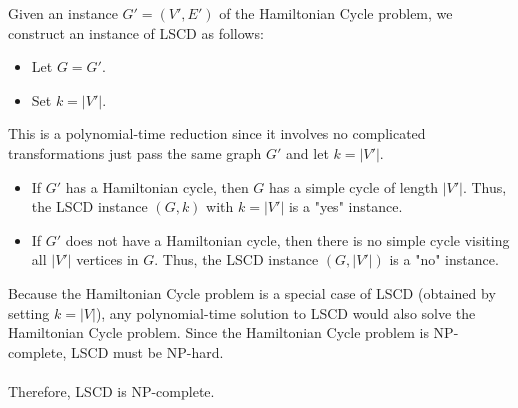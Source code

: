 \documentclass[12pt]{article}
\begin{document}
Given an instance \( G' = (V', E') \) of the Hamiltonian Cycle problem, we construct an instance of LSCD as follows:
\begin{itemize}
    \item Let \( G = G' \).
    \item Set \( k = |V'| \).
\end{itemize}
This is a polynomial-time reduction since it involves no complicated transformations just pass the same graph \( G' \) and let \( k = |V'| \).
\begin{itemize}
    \item If \( G' \) has a Hamiltonian cycle, then \( G \) has a simple cycle of length \( |V'| \). Thus, the LSCD instance \( (G, k) \) with \( k = |V'| \) is a "yes" instance.
    \item If \( G' \) does not have a Hamiltonian cycle, then there is no simple cycle visiting all \( |V'| \) vertices in \( G \). Thus, the LSCD instance \( (G, |V'|) \) is a "no" instance.
\end{itemize}
Because the Hamiltonian Cycle problem is a special case of LSCD (obtained by setting \( k = |V| \)), any polynomial-time solution to LSCD would also solve the Hamiltonian Cycle problem. Since the Hamiltonian Cycle problem is NP-complete, LSCD must be NP-hard.\\\\
Therefore, LSCD is NP-complete.
\end{document}
